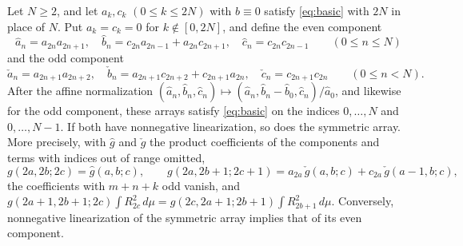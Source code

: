 \begin{theorem}\label{thm:decomp}
Let $N\geq2$, and let $a_k,c_k$ $(0\leq k\leq2N)$ with $b\equiv0$ satisfy \eqref{eq:basic} with $2N$ in place of $N$. Put $a_k=c_k=0$ for $k\notin[0,2N]$, and define the even component
\[
\hat a_n=a_{2n}a_{2n+1},\quad \hat b_n=c_{2n}a_{2n-1}+a_{2n}c_{2n+1},\quad \hat c_n=c_{2n}c_{2n-1}\qquad(0\leq n\leq N)
\]
and the odd component
\[
\check a_n=a_{2n+1}a_{2n+2},\quad \check b_n=a_{2n+1}c_{2n+2}+c_{2n+1}a_{2n},\quad \check c_n=c_{2n+1}c_{2n}\qquad(0\leq n<N).
\]
After the affine normalization $(\hat a_n,\hat b_n,\hat c_n)\mapsto(\hat a_n,\hat b_n-\hat b_0,\hat c_n)/\hat a_0$, and likewise for the odd component, these arrays satisfy \eqref{eq:basic} on the indices $0,\ldots,N$ and $0,\ldots,N-1$. If both have nonnegative linearization, so does the symmetric array. More precisely, with $\hat g$ and $\check g$ the product coefficients of the components and terms with indices out of range omitted,
\[
g(2a,2b;2c)=\hat g(a,b;c),\qquad
g(2a,2b+1;2c+1)=a_{2a}\,\check g(a,b;c)+c_{2a}\,\check g(a-1,b;c),
\]
the coefficients with $m+n+k$ odd vanish, and $g(2a+1,2b+1;2c)\int R_{2c}^2\,d\mu=g(2c,2a+1;2b+1)\int R_{2b+1}^2\,d\mu$. Conversely, nonnegative linearization of the symmetric array implies that of its even component.
\end{theorem}
